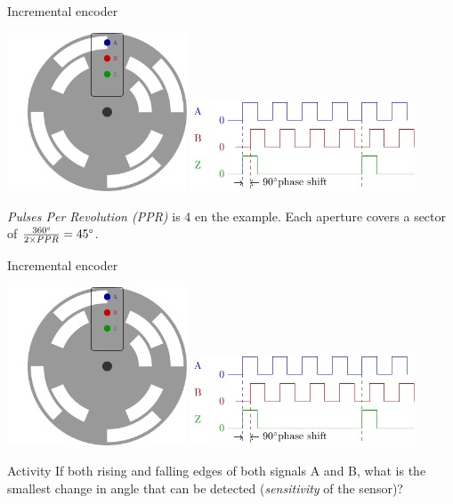 \documentclass[presentation,aspectratio=169]{beamer}
\begin{document}
\begin{frame}[label={sec:org67bb0a1}]{Incremental encoder}
\begin{center}
\includegraphics[width=0.4\textwidth]{../../figures/encoder-disc}
\includegraphics[width=0.5\textwidth]{../../figures/encoder-signals}
\end{center}

\emph{Pulses Per Revolution (PPR)} is 4 en the example. Each aperture covers a sector of \(\frac{360\degree}{2 \times PPR} = 45\degree\).
\end{frame}

\begin{frame}[label={sec:orgbc08758}]{Incremental encoder}
\begin{center}
\includegraphics[width=0.4\textwidth]{../../figures/encoder-disc}
\includegraphics[width=0.5\textwidth]{../../figures/encoder-signals}
\end{center}

\alert{Activity} If both rising \alert{and} falling edges of both signals \textcolor{blue!80!black}{A} and \textcolor{red!80!black}{B}, what is the smallest change in angle that can be detected (\emph{sensitivity} of the sensor)?
\end{frame}
\end{document}
